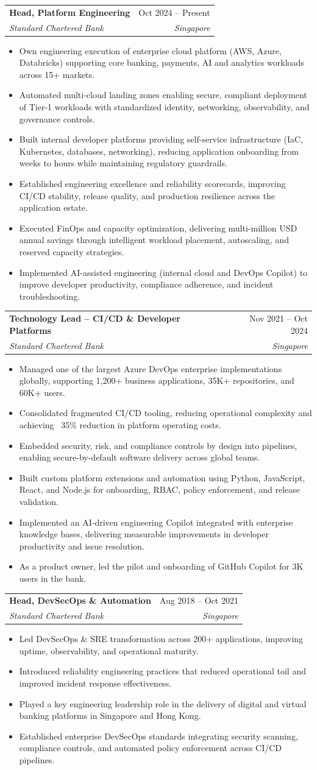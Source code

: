 \documentclass[letterpaper,11pt]{article}
\makeatletter
\newcommand{\resumeItem}[1]{
  \item\small{
    {#1 \vspace{-2pt}}
  }
}
\newcommand{\resumeSubheading}[4]{
  \vspace{-2pt}\item
    \begin{tabular*}{0.97\textwidth}[t]{l@{\extracolsep{\fill}}r}
      \textbf{#1} & #2 \\
      \textit{\small#3} & \textit{\small #4} \\
    \end{tabular*}\vspace{-7pt}
}
\newcommand{\resumeItemListStart}{\begin{itemize}}
\newcommand{\resumeItemListEnd}{\end{itemize}\vspace{-5pt}}
\makeatother
\begin{document}
    \resumeSubheading
    {Head, Platform Engineering}{Oct 2024 -- Present}
    {Standard Chartered Bank}{Singapore}
    \resumeItemListStart
      \resumeItem{Own engineering execution of enterprise cloud platform (AWS, Azure, Databricks) supporting core banking, payments, AI and analytics workloads across 15+ markets.}
      \resumeItem{Automated multi-cloud landing zones enabling secure, compliant deployment of Tier-1 workloads with standardized identity, networking, observability, and governance controls.}
      \resumeItem{Built internal developer platforms providing self-service infrastructure (IaC, Kubernetes, databases, networking), reducing application onboarding from weeks to hours while maintaining regulatory guardrails.}
      \resumeItem{Established engineering excellence and reliability scorecards, improving CI/CD stability, release quality, and production resilience across the application estate.}
      \resumeItem{Executed FinOps and capacity optimization, delivering multi-million USD annual savings through intelligent workload placement, autoscaling, and reserved capacity strategies.}
      \resumeItem{Implemented AI-assisted engineering (internal cloud and DevOps Copilot) to improve developer productivity, compliance adherence, and incident troubleshooting. }
    \resumeItemListEnd
    
    \resumeSubheading
    {Technology Lead – CI/CD \& Developer Platforms}{Nov 2021 -- Oct 2024}
    {Standard Chartered Bank}{Singapore}
    \resumeItemListStart
        \resumeItem{Managed one of the largest Azure DevOps enterprise implementations globally, supporting 1,200+ business applications, 35K+ repositories, and 60K+ users.}
        \resumeItem{Consolidated fragmented CI/CD tooling, reducing operational complexity and achieving ~35\% reduction in platform operating costs.}
        \resumeItem{Embedded security, risk, and compliance controls by design into pipelines, enabling secure-by-default software delivery across global teams.}
        \resumeItem{Built custom platform extensions and automation using Python, JavaScript, React, and Node.js for onboarding, RBAC, policy enforcement, and release validation.}
        \resumeItem{Implemented an AI-driven engineering Copilot integrated with enterprise knowledge bases, delivering measurable improvements in developer productivity and issue resolution.}
        \resumeItem{As a product owner, led the pilot and onboarding of GitHub Copilot for 3K users in the bank.}
    \resumeItemListEnd
  
    \resumeSubheading
      {Head, DevSecOps \& Automation}{Aug 2018 -- Oct 2021}
      {Standard Chartered Bank}{Singapore}
      \resumeItemListStart
        \resumeItem{Led DevSecOps \& SRE transformation across 200+ applications, improving uptime, observability, and operational maturity.}
        \resumeItem{Introduced reliability engineering practices that reduced operational toil and improved incident response effectiveness.}
        \resumeItem{Played a key engineering leadership role in the delivery of digital and virtual banking platforms in Singapore and Hong Kong.}
        \resumeItem{Established enterprise DevSecOps standards integrating security scanning, compliance controls, and automated policy enforcement across CI/CD pipelines.}
    \resumeItemListEnd
    
\end{document}
